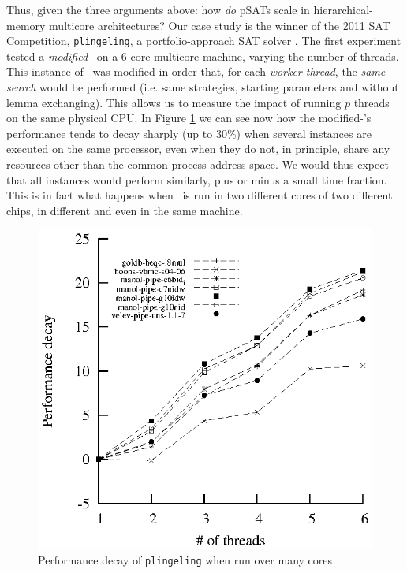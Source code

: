 Thus, given the three arguments above: how {\em do} pSATs scale in
hierarchical-memory multicore architectures? Our case study is the
winner of the 2011 SAT Competition, {\tt plingeling}, a
portfolio-approach SAT solver \cite{lingeling}. The first experiment
tested a \emph{modified} \pling\ on a 6-core multicore machine,
varying the number of threads. This instance of \pling\ was modified
in order that, for each {\em worker thread}, the {\em same search}
would be performed (i.e. same strategies, starting parameters and
without lemma exchanging). This allows us to measure the impact of
running $p$ threads on the same physical CPU. In Figure
\ref{fig:decay} we can see now how the modified-\pling's performance
tends to decay sharply (up to 30\%) when several instances are
executed on the same processor, even when they do not, in principle,
share any resources other than the common process address space. We
would thus expect that all instances would perform similarly, plus or
minus a small time fraction. This is in fact what happens when \pling\
is run in two different cores of two different chips, in different
and even in the same machine.

\begin{figure}[tp]
  \centering
  \includegraphics[scale=1]{plingeling_6cores_speedup}
  \caption{Performance decay of {\tt plingeling} when run over many cores}
  \label{fig:decay}
\end{figure}

